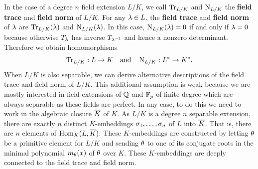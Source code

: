     In the case of a degree \(n\) field extension \(L/K\), we call \(\operatorname{\mathrm{Tr}}_{L/K}\) and \(\operatorname{\mathrm{N}}_{L/K}\) the \textbf{field trace} and \textbf{field norm} of \(L/K\). For any \(\lambda \in L\), the \textbf{field trace} and \textbf{field norm} of \(\lambda\) are \(\operatorname{\mathrm{Tr}}_{L/K}(\lambda)\) and \(\operatorname{\mathrm{N}}_{L/K}(\lambda)\). In this case, \(\operatorname{\mathrm{N}}_{L/K}(\lambda) = 0\) if and only if \(\lambda = 0\) because otherwise \(T_{\lambda}\) has inverse \(T_{\lambda^{-1}}\) and hence a nonzero determinant. Therefore we obtain homomorphisms
    \[
      \operatorname{\mathrm{Tr}}_{L/K}:L \to K \quad \text{and} \quad \operatorname{\mathrm{N}}_{L/K}:L^{\ast} \to K^{\ast}.
    \]
    When \(L/K\) is also separable, we can derive alternative descriptions of the field trace and field norm of \(L/K\). This additional assumption is weak because we are mostly interested in field extensions of \(\mathbb{Q}\) and \(\mathbb{F}_{p}\) of finite degree which are always separable as these fields are perfect. In any case, to do this we need to work in the algebraic closure \(\overline{K}\) of \(K\). As \(L/K\) is a degree \(n\) separable extension, there are exactly \(n\) distinct \(K\)-embeddings \(\sigma_{1},\ldots,\sigma_{n}\) of \(L\) into \(\overline{K}\). That is, there are \(n\) elements of \(\operatorname{\mathrm{Hom}}_{K}(L,\overline{K})\). These \(K\)-embeddings are constructed by letting \(\theta\) be a primitive element for \(L/K\) and sending \(\theta\) to one of its conjugate roots in the minimal polynomial \(m_{\theta}(x)\) of \(\theta\) over \(K\). These \(K\)-embeddings are deeply connected to the field trace and field norm.

